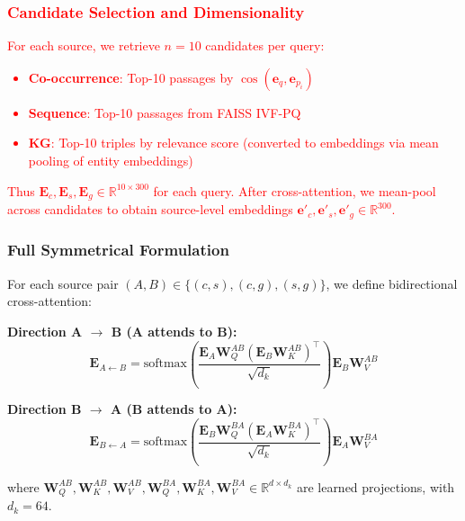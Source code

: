 \documentclass[10pt,twocolumn]{article}
\newcommand{\revisioncritical}[1]{\textcolor{red}{#1}}
\begin{document}
\revisioncritical{
\subsubsection{Candidate Selection and Dimensionality}
\label{sec:candidate_selection}

For each source, we retrieve $n=10$ candidates per query:

\begin{itemize}
    \item \textbf{Co-occurrence}: Top-10 passages by $\cos(\mathbf{e}_q, \mathbf{e}_{p_i})$
    \item \textbf{Sequence}: Top-10 passages from FAISS IVF-PQ
    \item \textbf{KG}: Top-10 triples by relevance score (converted to embeddings via mean pooling of entity embeddings)
\end{itemize}

Thus $\mathbf{E}_c, \mathbf{E}_s, \mathbf{E}_g \in \mathbb{R}^{10 \times 300}$ for each query. After cross-attention, we mean-pool across candidates to obtain source-level embeddings $\mathbf{e}'_c, \mathbf{e}'_s, \mathbf{e}'_g \in \mathbb{R}^{300}$.
}

\subsubsection{Full Symmetrical Formulation}

For each source pair $(A, B) \in \{(c,s), (c,g), (s,g)\}$, we define bidirectional cross-attention:

\textbf{Direction A $\rightarrow$ B (A attends to B):}
\begin{equation}
\mathbf{E}_{A \leftarrow B} = \text{softmax}\left(\frac{\mathbf{E}_A \mathbf{W}_Q^{AB} (\mathbf{E}_B \mathbf{W}_K^{AB})^\top}{\sqrt{d_k}}\right) \mathbf{E}_B \mathbf{W}_V^{AB}
\end{equation}

\textbf{Direction B $\rightarrow$ A (B attends to A):}
\begin{equation}
\mathbf{E}_{B \leftarrow A} = \text{softmax}\left(\frac{\mathbf{E}_B \mathbf{W}_Q^{BA} (\mathbf{E}_A \mathbf{W}_K^{BA})^\top}{\sqrt{d_k}}\right) \mathbf{E}_A \mathbf{W}_V^{BA}
\end{equation}

where $\mathbf{W}_Q^{AB}, \mathbf{W}_K^{AB}, \mathbf{W}_V^{AB}, \mathbf{W}_Q^{BA}, \mathbf{W}_K^{BA}, \mathbf{W}_V^{BA} \in \mathbb{R}^{d \times d_k}$ are learned projections, with $d_k = 64$.
\end{document}
